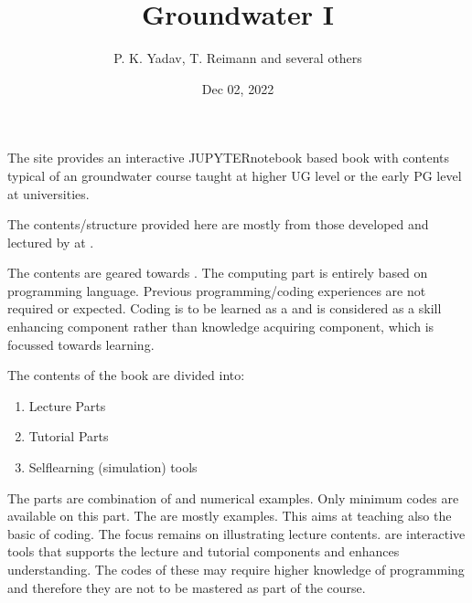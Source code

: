\documentclass[letterpaper,10pt,english]{jupyterBook}
\title{Groundwater I}
\date{Dec 02, 2022}
\author{P.\@{} K.\@{} Yadav, T.\@{} Reimann and several others}
\begin{document}
\pagestyle{empty}
\sphinxmaketitle
\pagestyle{plain}
\sphinxtableofcontents
\pagestyle{normal}
\label{\detokenize{intro::doc}}


\sphinxAtStartPar
The site provides an interactive JUPYTER\sphinxhyphen{}notebook based book with contents typical of an  groundwater course taught at higher UG level or the early PG level at universities.

\sphinxAtStartPar
The contents/structure provided here are mostly from those developed and lectured by  at .

\sphinxAtStartPar
The contents are geared towards . The computing part is entirely based on  programming language. Previous programming/coding experiences are not required or expected. Coding is to be learned as a  and is considered as a skill enhancing component rather than knowledge acquiring component, which is focussed towards  learning.

\sphinxAtStartPar
The contents of the book are divided into:
\begin{enumerate}
%
\item {} 
\sphinxAtStartPar
Lecture Parts

\item {} 
\sphinxAtStartPar
Tutorial Parts

\item {} 
\sphinxAtStartPar
Self\sphinxhyphen{}learning (simulation) tools

\end{enumerate}

\sphinxAtStartPar
The  parts are combination of  and  numerical examples. Only minimum  codes are available on this part.
The  are mostly  examples. This aims at teaching also the basic of  coding. The focus remains on illustrating lecture contents.  are interactive tools that supports the lecture and tutorial components and enhances understanding. The codes of these  may require higher knowledge of  programming and therefore they are not to be mastered as part of the course.
\end{document}
